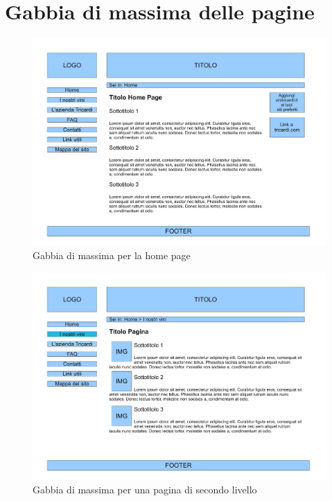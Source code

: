 \documentclass[a4paper]{report}	%
\begin{document}
\chapter{Gabbia di massima delle pagine}
\begin{figure}
\centering
\includegraphics[scale=0.5]{gabbia_di_massima_home.pdf}
\caption{Gabbia di massima per la home page}\label{fig2}
\end{figure}
\begin{figure}
\centering
\includegraphics[scale=0.5]{gabbia_di_massima_page.pdf}
\caption{Gabbia di massima per una pagina di secondo livello}\label{fig3}
\end{figure}
\end{document}
